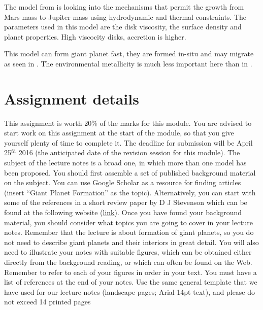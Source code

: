 \documentclass[12pt]{article} %
\begin{document}
\noindent The model from \cite{lissauer2009models} is looking into the mechanisms that permit the growth from Mars mass to Jupiter mass using hydrodynamic and thermal constraints. The parameters used in this model are the disk viscosity, the surface density and planet properties.\newline
High viscocity disks, accretion is higher.\newline

\noindent This model can form giant planet fast, they are formed in-situ and may migrate as seen in \cite{chambers2009planetary}. The environmental metallicity is much less important here than in \cite{pollack1996formation}.

\clearpage
\section{Assignment details}\vspace{-2ex}\titlerule[1pt]\bigskip

This assignment is worth 20\% of the marks for this module. You are advised to start work on this assignment at the start of the module, so that you give yourself plenty of time to complete it. The deadline for submission will be April 25$^{th}$ 2016 (the anticipated date of the revision session for this module).\newline\linebreak
The subject of the lecture notes is a broad one, in which more than one model has been proposed. You should first assemble a set of published background material on the subject. You can use Google Scholar as a resource for finding articles (insert “Giant Planet Formation” as the topic). Alternatively, you can start with some of the references in a short review paper by D J Stevenson which can be found at the following website (\href{http://authors.library.caltech.edu/9922/1/STEaipcp04.pdf}{link}).\newline \linebreak
Once you have found your background material, you should consider what topics you are going to cover in your lecture notes. Remember that the lecture is about formation of giant planets, so you do not need to describe giant planets and their interiors in great detail. You will also need to illustrate your notes with suitable figures, which can be obtained either directly from the background reading, or which can often be found on the Web. Remember to refer to each of your figures in order in your text. You must have a list of references at the end of your notes.\newline\linebreak
Use the same general template that we have used for our lecture notes (landscape pages; Arial 14pt text), and please do not exceed 14 printed pages



\newpage

\end{document}
